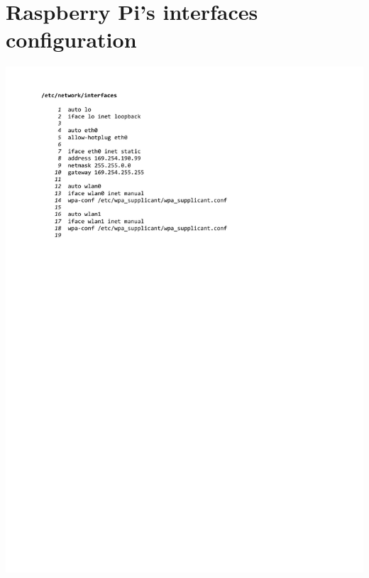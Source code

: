 
\chapter{Raspberry Pi's interfaces configuration} \label{app:interfaces}

\includegraphics[width=\textwidth,clip,trim={1.5cm 19.7cm 1cm 1.5cm}]{./files/interfaces.pdf}
~\\[1em]
